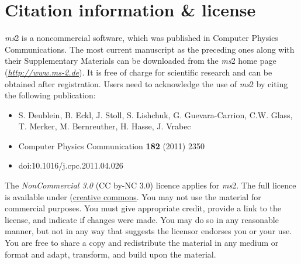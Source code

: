 \section{Citation information \& license}
\label{sec:Citation information}

\textit{ms}2 is a noncommercial software, which was published in Computer Physics Communications. The most current manuscript as the preceding ones along with their Supplementary Materials can be downloaded from the \textit{ms}2 home page (\href{http://www.ms-2.de}{\textit{http://www.ms-2.de}}). It is free of charge for scientific research and can be obtained after registration. Users need to acknowledge the use of \textit{ms}2 by citing the following publication:
\begin{itemize}
	\item[ ] S. Deublein, B. Eckl, J. Stoll, S. Lishchuk, G. Guevara-Carrion, C.W. Glass, T. Merker, M. Bernreuther, H. Hasse, J. Vrabec
	\item[ ] Computer Physics Communication \textbf{182} (2011) 2350
	\item[ ] doi:10.1016/j.cpc.2011.04.026
\end{itemize}



The \textit{NonCommercial 3.0} (CC by-NC 3.0) licence applies for \textit{ms}2. The full licence is available under (\href{https://creativecommons.org/licenses/by-nc/3.0/legalcode}{creative commons}. You may not use the material for commercial purposes. You must give appropriate credit, provide a link to the license, and indicate if changes were made. You may do so in any reasonable manner, but not in any way that suggests the licensor endorses you or your use. You are free to share a copy and redistribute the material in any medium or format and adapt, transform, and build upon the material. 





